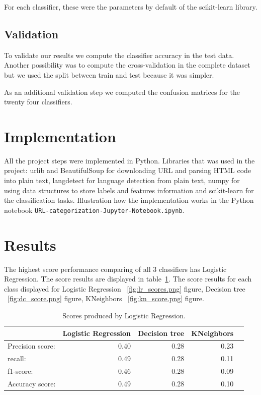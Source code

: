 \documentclass{article} %
\begin{document}
For each classifier, these were the parameters by default of the scikit-learn library. 
 
\subsection{Validation}
 
 To validate our results we compute the classifier accuracy in the test data. Another possibility was to compute the cross-validation in the complete dataset but we used the split between train and test because it was simpler. 

 As an additional validation step we computed the confusion matrices for the twenty four classifiers.
 
\section{Implementation}
 All the project steps were implemented in Python. Libraries that was used in the project: urlib and BeautifulSoup for downloading URL and parsing HTML code into plain text, langdetect for language detection from plain text, numpy for using data structures to store labels and features information and scikit-learn for the classification tasks. Illustration how the implementation works in the Python notebook \texttt{URL-categorization-Jupyter-Notebook.ipynb}.


\section{Results}
The highest score performance comparing of all 3 classifiers has Logistic Regression. The score results are displayed in table~\ref{tab:lr_score}.
The score results for each class displayed for Logistic Regression ~\ref{fig:lr_scores.png} figure, Decision tree ~\ref{fig:dc_score.png} figure, KNeighbors ~\ref{fig:kn_score.png} figure.
\begin{table}[H]
	\centering
	\begin{tabular}{lrrrr}
		 &   \textbf{Logistic Regression}     &  \textbf{Decision tree}     &  \textbf{KNeighbors} \\\hline
		\toprule \hline
		Precision score:     &  0.40 &   0.28 &   0.23 \\\hline
		recall:     &   0.49 &   0.28 &   0.11 \\\hline
		f1-score:     &   0.46 &   0.28 &   0.09 \\\hline
		Accuracy score:     &   0.49 &   0.28 &   0.10 \\\hline
		\bottomrule \hline
	\end{tabular}
	\caption{Scores produced by Logistic Regression.}
	\label{tab:lr_score}
\end{table}	
\end{document}

